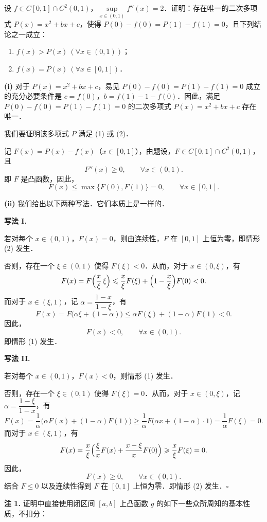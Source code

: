 设 $f\in C[0,1]\cap C^2(0,1)$，$\sup\limits_{x\in(0,1)}f''(x)=2$．证明：存在唯一的二次多项式 $P(x)=x^2+bx+c$，使得 $P(0)-f(0)=P(1)-f(1)=0$，且下列结论之一成立：
\begin{enumerate}[label=(\arabic*)]
  \item $f(x)>P(x)\ (\forall x\in(0,1))$；
  \item $f(x)=P(x)\ (\forall x\in[0,1])$．
\end{enumerate}
\begin{solution}
\textbf{(i)} 对于 $P(x)=x^2+bx+c$，易见 $P(0)-f(0)=P(1)-f(1)=0$ 成立的充分必要条件是 $c=f(0)$，$b=f(1)-1-f(0)$．因此，满足 $P(0)-f(0)=P(1)-f(1)=0$ 的二次多项式 $P(x)=x^2+bx+c$ 存在唯一．

我们要证明该多项式 $P$ 满足 (1) 或 (2)．

记 $F(x)=P(x)-f(x)$（$x\in[0,1]$），由题设，$F\in C[0,1]\cap C^2(0,1)$，且
\[
F''(x)\geqslant 0,\qquad \forall x\in(0,1).
\]
即 $F$ 是凸函数，因此，
\[
F(x)\leqslant \max\{F(0),F(1)\}=0,\qquad \forall x\in[0,1].
\]

\textbf{(ii)} 我们给出以下两种写法．它们本质上是一样的．

\textbf{写法 I.}\par
若对每个 $x\in(0,1)$，$F(x)=0$，则由连续性，$F$ 在 $[0,1]$ 上恒为零，即情形 (2) 发生．

否则，存在一个 $\xi\in(0,1)$ 使得 $F(\xi)<0$．从而，对于 $x\in(0,\xi)$，有
\[
F(x)=F\Bigl(\frac{x}{\xi}\,\xi\Bigr)
\leqslant\frac{x}{\xi}F(\xi)+\Bigl(1-\frac{x}{\xi}\Bigr)F(0)<0.
\]
而对于 $x\in(\xi,1)$，记 $\alpha=\dfrac{1-x}{1-\xi}$，有
\[
F(x)=F\bigl(\alpha\xi+(1-\alpha)\bigr)
\leqslant\alpha F(\xi)+(1-\alpha)F(1)<0.
\]
因此，
\[
F(x)<0,\qquad \forall x\in(0,1).
\]
即情形 (1) 发生．

\textbf{写法 II.}\par
若对每个 $x\in(0,1)$，$F(x)<0$，则情形 (1) 发生．

否则，存在一个 $\xi\in(0,1)$ 使得 $F(\xi)=0$．从而，对于 $x\in(0,\xi)$，记 $\alpha=\dfrac{1-\xi}{1-x}$，有
\[
F(x)=\frac{1}{\alpha}\bigl(\alpha F(x)+(1-\alpha)F(1)\bigr)
\geqslant\frac{1}{\alpha}F\bigl(\alpha x+(1-\alpha)\cdot 1\bigr)
=\frac{1}{\alpha}F(\xi)=0.
\]
而对于 $x\in(\xi,1)$，有
\[
F(x)=\frac{x}{\xi}\Bigl(\frac{\xi}{x}F(x)+\frac{x-\xi}{x}F(0)\Bigr)
\geqslant\frac{x}{\xi}F(\xi)=0.
\]
因此，
\[
F(x)\geqslant 0,\qquad \forall x\in(0,1).
\]
结合 $F\leqslant 0$ 以及连续性得到 $F$ 在 $[0,1]$ 上恒为零．即情形 (2) 发生．$\square$

\textbf{注 1.} 证明中直接使用闭区间 $[a,b]$ 上凸函数 $g$ 的如下一些众所周知的基本性质，不扣分：


\end{solution}
